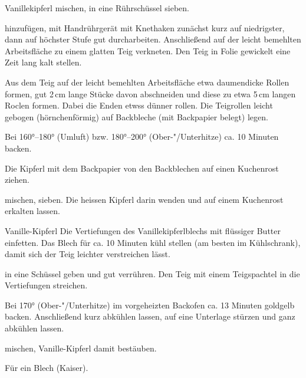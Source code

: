 \begin{recipe}{Vanillekipferl}
  mischen, in eine Rührschüssel sieben.
  
  hinzufügen, mit Handrührgerät mit Knethaken zunächst kurz auf
  niedrigster, dann auf höchster Stufe gut durcharbeiten.
  Anschließend auf der leicht bemehlten Arbeitsfläche zu einem glatten
  Teig verkneten. Den Teig in Folie gewickelt eine Zeit lang kalt
  stellen.

  Aus dem Teig auf der leicht bemehlten Arbeitsfläche etwa daumendicke
  Rollen formen, gut 2\,cm lange Stücke davon abschneiden und diese zu
  etwa 5\,cm langen Roclen formen. Dabei die Enden etwss dünner rollen.
  Die Teigrollen leicht gebogen (hörnchenförmig) auf Backbleche (mit
  Backpapier belegt) legen.

  Bei 160°--180° (Umluft) bzw. 180°--200° (Ober-"/Unterhitze) ca. 10 Minuten backen.

  Die Kipferl mit dem Backpapier von den Backblechen auf einen
  Kuchenrost ziehen.
  
  mischen, sieben. Die heissen Kipferl darin wenden und auf einem
  Kuchenrost erkalten lassen.
\end{recipe}



\begin{recipe}{Vanille-Kipferl}
  Die Vertiefungen des Vanillekipferlblechs mit flüssiger Butter
  einfetten. Das Blech für ca. 10 Minuten kühl stellen (am besten im
  Kühlschrank), damit sich der Teig leichter verstreichen lässt.
  
  in eine Schüssel geben und gut verrühren. Den Teig mit einem
  Teigspachtel in die Vertiefungen streichen.

  Bei 170° (Ober-"/Unterhitze) im vorgeheizten Backofen ca. 13 Minuten
  goldgelb backen. Anschließend kurz abkühlen lassen, auf eine Unterlage
  stürzen und ganz abkühlen lassen.
  
  mischen, Vanille-Kipferl damit bestäuben.

  Für ein Blech (Kaiser).
\end{recipe}



